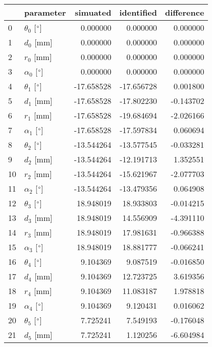 \documentclass{standalone}%
\begin{document}
%
\normalsize%
\begin{tabular}{llrrr}
\toprule
{} &                 parameter &   simuated & identified & difference \\
\midrule
0  &  $\theta_{0}$ [$\degree$] &   0.000000 &   0.000000 &   0.000000 \\
1  &              $d_{0}$ [mm] &   0.000000 &   0.000000 &   0.000000 \\
2  &              $r_{0}$ [mm] &   0.000000 &   0.000000 &   0.000000 \\
3  &  $\alpha_{0}$ [$\degree$] &   0.000000 &   0.000000 &   0.000000 \\
4  &  $\theta_{1}$ [$\degree$] & -17.658528 & -17.656728 &   0.001800 \\
5  &              $d_{1}$ [mm] & -17.658528 & -17.802230 &  -0.143702 \\
6  &              $r_{1}$ [mm] & -17.658528 & -19.684694 &  -2.026166 \\
7  &  $\alpha_{1}$ [$\degree$] & -17.658528 & -17.597834 &   0.060694 \\
8  &  $\theta_{2}$ [$\degree$] & -13.544264 & -13.577545 &  -0.033281 \\
9  &              $d_{2}$ [mm] & -13.544264 & -12.191713 &   1.352551 \\
10 &              $r_{2}$ [mm] & -13.544264 & -15.621967 &  -2.077703 \\
11 &  $\alpha_{2}$ [$\degree$] & -13.544264 & -13.479356 &   0.064908 \\
12 &  $\theta_{3}$ [$\degree$] &  18.948019 &  18.933803 &  -0.014215 \\
13 &              $d_{3}$ [mm] &  18.948019 &  14.556909 &  -4.391110 \\
14 &              $r_{3}$ [mm] &  18.948019 &  17.981631 &  -0.966388 \\
15 &  $\alpha_{3}$ [$\degree$] &  18.948019 &  18.881777 &  -0.066241 \\
16 &  $\theta_{4}$ [$\degree$] &   9.104369 &   9.087519 &  -0.016850 \\
17 &              $d_{4}$ [mm] &   9.104369 &  12.723725 &   3.619356 \\
18 &              $r_{4}$ [mm] &   9.104369 &  11.083187 &   1.978818 \\
19 &  $\alpha_{4}$ [$\degree$] &   9.104369 &   9.120431 &   0.016062 \\
20 &  $\theta_{5}$ [$\degree$] &   7.725241 &   7.549193 &  -0.176048 \\
21 &              $d_{5}$ [mm] &   7.725241 &   1.120256 &  -6.604984 \\

\end{tabular}
\end{document}
